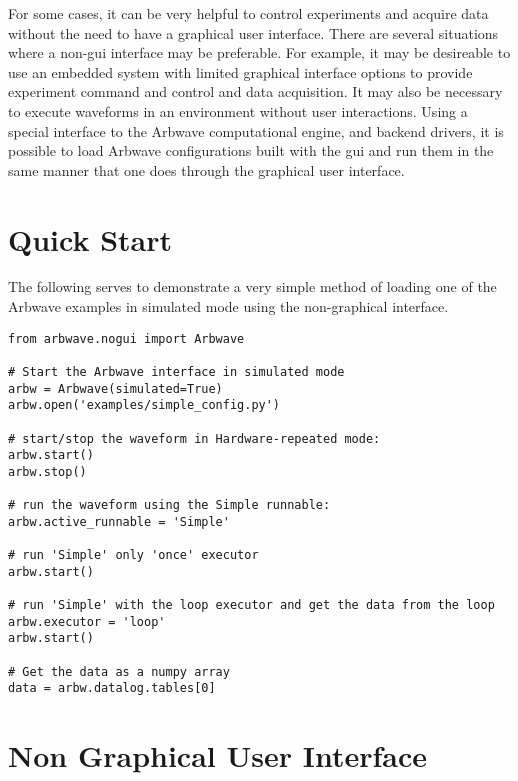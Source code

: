 \thispagestyle{fancy}
\pagestyle{fancy}

For some cases, it can be very helpful to control experiments and acquire data
without the need to have a graphical user interface.  There are several
situations where a non-gui interface may be preferable.  For example, it may be
desireable to use an embedded system with limited graphical interface options to
provide experiment command and control and data acquisition.  It may also be
necessary to execute waveforms in an environment without user interactions.
Using a special interface to the Arbwave computational engine, and backend
drivers, it is possible to load Arbwave configurations built with the gui and
run them in the same manner that one does through the graphical user interface.

\section{Quick Start}

The following serves to demonstrate a very simple method of loading one of the
Arbwave examples in simulated mode using the non-graphical interface.

\begin{lstlisting}
from arbwave.nogui import Arbwave

# Start the Arbwave interface in simulated mode
arbw = Arbwave(simulated=True)
arbw.open('examples/simple_config.py')

# start/stop the waveform in Hardware-repeated mode:
arbw.start()
arbw.stop()

# run the waveform using the Simple runnable:
arbw.active_runnable = 'Simple'

# run 'Simple' only 'once' executor
arbw.start()

# run 'Simple' with the loop executor and get the data from the loop
arbw.executor = 'loop'
arbw.start()

# Get the data as a numpy array
data = arbw.datalog.tables[0]
\end{lstlisting}

\section{Non Graphical User Interface}


